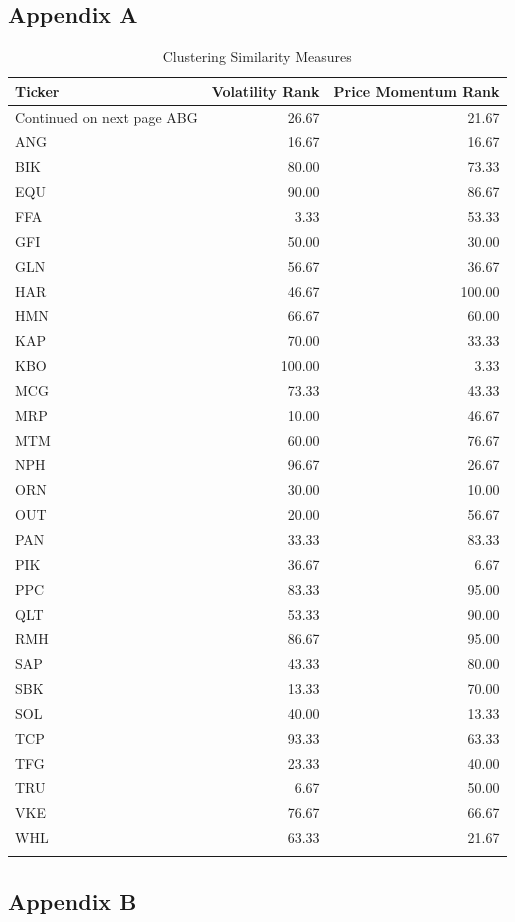 \documentclass[11pt,preprint, authoryear]{elsarticle}
\numberwithin{equation}{section}
\numberwithin{figure}{section}
\numberwithin{table}{section}
\begin{document}
\hypertarget{appendix-a}{%
\subsection{Appendix A}\label{appendix-a}}

\begingroup\fontsize{12pt}{13pt}\selectfont
\begin{longtable}{lrr}
  \toprule
Ticker & Volatility  Rank & Price Momentum Rank \\ 
  \hline 
\endhead 
\hline 
{\footnotesize Continued on next page} 
\endfoot 
\endlastfoot 
 \midrule
ABG & 26.67 & 21.67 \\ 
  ANG & 16.67 & 16.67 \\ 
  BIK & 80.00 & 73.33 \\ 
  EQU & 90.00 & 86.67 \\ 
  FFA & 3.33 & 53.33 \\ 
  GFI & 50.00 & 30.00 \\ 
  GLN & 56.67 & 36.67 \\ 
  HAR & 46.67 & 100.00 \\ 
  HMN & 66.67 & 60.00 \\ 
  KAP & 70.00 & 33.33 \\ 
  KBO & 100.00 & 3.33 \\ 
  MCG & 73.33 & 43.33 \\ 
  MRP & 10.00 & 46.67 \\ 
  MTM & 60.00 & 76.67 \\ 
  NPH & 96.67 & 26.67 \\ 
  ORN & 30.00 & 10.00 \\ 
  OUT & 20.00 & 56.67 \\ 
  PAN & 33.33 & 83.33 \\ 
  PIK & 36.67 & 6.67 \\ 
  PPC & 83.33 & 95.00 \\ 
  QLT & 53.33 & 90.00 \\ 
  RMH & 86.67 & 95.00 \\ 
  SAP & 43.33 & 80.00 \\ 
  SBK & 13.33 & 70.00 \\ 
  SOL & 40.00 & 13.33 \\ 
  TCP & 93.33 & 63.33 \\ 
  TFG & 23.33 & 40.00 \\ 
  TRU & 6.67 & 50.00 \\ 
  VKE & 76.67 & 66.67 \\ 
  WHL & 63.33 & 21.67 \\ 
   \bottomrule
\caption{Clustering Similarity Measures\label{tab1}} 
\end{longtable}
\endgroup

\hypertarget{appendix-b}{%
\subsection{Appendix B}\label{appendix-b}}


\end{document}
